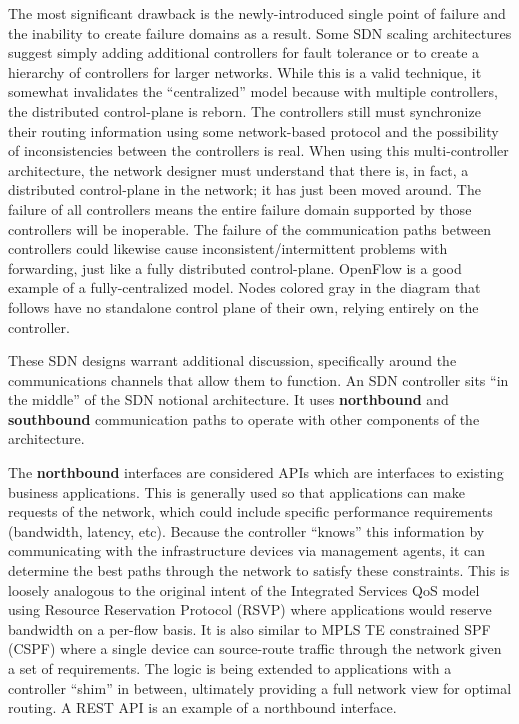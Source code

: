 \begin{enumerate}
  The most significant drawback is the newly-introduced single point of
  failure and the inability to create failure domains as a result. Some SDN
  scaling architectures suggest simply adding additional controllers for fault
  tolerance or to create a hierarchy of controllers for larger networks. While
  this is a valid technique, it somewhat invalidates the ``centralized'' model
  because with multiple controllers, the distributed control-plane is reborn.
  The controllers still must synchronize their routing information using some
  network-based protocol and the possibility of inconsistencies between the
  controllers is real. When using this multi-controller architecture, the
  network designer must understand that there is, in fact, a distributed
  control-plane in the network; it has just been moved around. The failure of
  all controllers means the entire failure domain supported by those
  controllers will be inoperable. The failure of the communication paths
  between controllers could likewise cause inconsistent/intermittent problems
  with forwarding, just like a fully distributed control-plane. OpenFlow is a
  good example of a fully-centralized model. Nodes colored gray in the diagram
  that follows have no standalone control plane of their own, relying
  entirely on the controller.

\end{enumerate}

These SDN designs warrant additional discussion, specifically around the
communications channels that allow them to function. An SDN controller sits
``in the middle'' of the SDN notional architecture. It uses \textbf{northbound}
and \textbf{southbound} communication paths to operate with other components
of the architecture.

The \textbf{northbound} interfaces are considered APIs which are interfaces to existing
business applications. This is generally used so that applications can make
requests of the network, which could include specific performance requirements
(bandwidth, latency, etc). Because the controller ``knows'' this information
by communicating with the infrastructure devices via management agents, it can
determine the best paths through the network to satisfy these constraints.
This is loosely analogous to the original intent of the Integrated Services
QoS model using Resource Reservation Protocol (RSVP) where applications would
reserve bandwidth on a per-flow basis. It is also similar to MPLS TE
constrained SPF (CSPF) where a single device can source-route traffic through
the network given a set of requirements. The logic is being extended to
applications with a controller ``shim'' in between, ultimately providing a
full network view for optimal routing. A REST API is an example of a
northbound interface.

